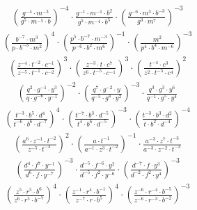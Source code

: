 \begin{align}
\left(\frac{g^{-4}\cdot m^{-3}}{g^{5}\cdot m^{-5}\cdot b}\right)^{-4}\cdot \frac{g^{-1}\cdot m^{-1}\cdot b^{2}}{g^{5}\cdot m^{-4}\cdot b^{5}}\cdot \left(\frac{g^{-6}\cdot m^{3}\cdot b^{-3}}{g^{3}\cdot m^{7}}\right)^{-3}
\end{align}
\begin{align}
\left(\frac{b^{-7}\cdot m^{3}}{p\cdot b^{-3}\cdot m^{2}}\right)^{4}\cdot \left(\frac{p^{5}\cdot b^{-7}\cdot m^{-3}}{p^{-6}\cdot b^{2}\cdot m^{6}}\right)^{-1}\cdot \left(\frac{m^{2}}{p^{4}\cdot b^{4}\cdot m^{-6}}\right)^{-3}
\end{align}
\begin{align}
\left(\frac{z^{-4}\cdot t^{-2}\cdot c^{-1}}{z^{-5}\cdot t^{-1}\cdot c^{-2}}\right)^{3}\cdot \left(\frac{z^{-3}\cdot t\cdot c^{7}}{z^{6}\cdot t^{-5}\cdot c^{-1}}\right)^{3}\cdot \left(\frac{t^{-4}\cdot c^{3}}{z^{2}\cdot t^{-5}\cdot c^{4}}\right)^{2}
\end{align}
\begin{align}
\left(\frac{q^{2}\cdot g^{-1}\cdot y^{3}}{q\cdot g^{-6}\cdot y^{-1}}\right)^{-2}\cdot \left(\frac{q^{7}\cdot g^{-2}\cdot y}{q^{-5}\cdot g^{4}\cdot y^{2}}\right)^{-3}\cdot \frac{q^{3}\cdot g^{3}\cdot y^{6}}{q^{-1}\cdot g^{5}\cdot y^{4}}
\end{align}
\begin{align}
\left(\frac{t^{-3}\cdot b^{5}\cdot d^{4}}{t^{-6}\cdot b^{6}\cdot d^{-7}}\right)^{4}\cdot \left(\frac{t^{-7}\cdot b^{3}\cdot d^{-5}}{t^{4}\cdot b^{6}\cdot d^{-5}}\right)^{-3}\cdot \left(\frac{t^{-3}\cdot b^{3}\cdot d^{2}}{t\cdot b^{2}\cdot d^{-4}}\right)^{-4}
\end{align}
\begin{align}
\left(\frac{a^{6}\cdot z^{-1}\cdot t^{-2}}{z^{-5}\cdot t^{-3}}\right)^{2}\cdot \left(\frac{a\cdot t^{-1}}{a^{-1}\cdot z^{3}\cdot t^{-2}}\right)^{-1}\cdot \frac{a^{-3}\cdot z^{7}\cdot t^{-3}}{a^{-3}\cdot z^{-2}\cdot t^{-3}}
\end{align}
\begin{align}
\left(\frac{d^{4}\cdot f^{7}\cdot y^{-1}}{d^{6}\cdot f\cdot y^{-7}}\right)^{-3}\cdot \frac{d^{-5}\cdot f^{-6}\cdot y^{2}}{d^{-5}\cdot f^{2}\cdot y^{-6}}\cdot \left(\frac{d^{-7}\cdot f\cdot y^{3}}{d^{-2}\cdot f^{2}\cdot y^{4}}\right)^{-3}
\end{align}
\begin{align}
\left(\frac{z^{5}\cdot r^{5}\cdot b^{6}}{z^{6}\cdot r^{5}\cdot b^{-7}}\right)^{4}\cdot \left(\frac{z^{-1}\cdot r^{4}\cdot b^{-1}}{z^{-7}\cdot r\cdot b^{5}}\right)^{4}\cdot \left(\frac{z^{-6}\cdot r^{-4}\cdot b^{-5}}{z^{-6}\cdot r^{-3}\cdot b^{-2}}\right)^{-3}
\end{align}
